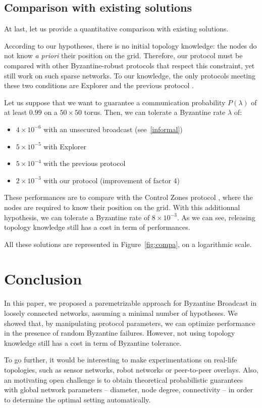 \documentclass[a4paper,11pt]{article}
\begin{document}
\subsection{Comparison with existing solutions}

At last, let us provide a quantitative comparison with existing solutions. 

According to our hypotheses, there is no initial topology knowledge:
the nodes do not know \emph{a priori} their position on the grid. Therefore, our protocol must be compared with other Byzantine-robust protocols that respect this constraint, yet still work on such sparse networks.
To our knowledge, the only protocols meeting these two conditions
are Explorer \cite{NT09j} and the previous protocol \cite{Trig}.

Let us suppose that we want to guarantee a communication probability $P(\lambda)$ of at least $0.99$ on a $50 \times 50$ torus. Then, we can tolerate a Byzantine rate $\lambda$ of:
\begin{itemize}
\item $4 \times 10^{-6}$ with an unsecured broadcast (see~\ref{informal})
\item $5 \times 10^{-5}$ with Explorer \cite{NT09j}
\item $5 \times 10^{-4}$ with the previous protocol \cite{Trig}
\item $2 \times 10^{-3}$ with our protocol (improvement of factor $4$)
\end{itemize}

These performances are to compare with the Control Zones protocol \cite{CtrZ}, where the nodes are required to know their position on the grid. With this additionnal hypothesis, we can tolerate a Byzantine rate of $8 \times 10^{-3}$. As we can see, releasing topology knowledge still has a cost in term of performances.

All these solutions are represented in Figure~\ref{fig:compa}, on a logarithmic scale.

\section{Conclusion}

In this paper, we proposed a paremetrizable approach for Byzantine Broadcast in loosely connected networks, assuming a minimal number of hypotheses.
We showed that, by manipulating protocol parameters, we can optimize performance in the presence of random Byzantine failures.
However, not using topology knowledge still has a cost in term of Byzantine tolerance.

To go further, it would be interesting to make experimentations on real-life topologies, such as sensor networks, robot networks or peer-to-peer overlays. Also, an motivating open challenge is to obtain theoretical probabilistic guarantees with global network parameters -- diameter, node degree, connectivity -- in order to determine the optimal setting automatically.



\end{document}
